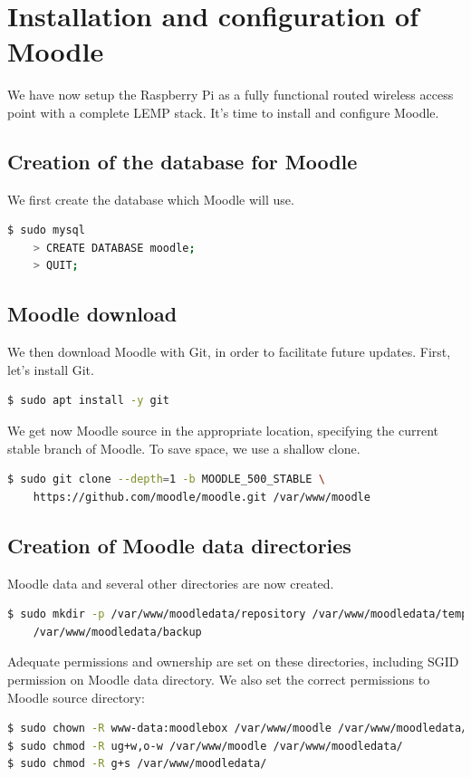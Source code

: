 \documentclass[12pt]{article}
\begin{document}
\section{Installation and configuration of Moodle}

We have now setup the Raspberry Pi as a fully functional routed wireless access point with a complete LEMP stack.
It's time to install and configure Moodle.

\subsection{Creation of the database for Moodle}

We first create the database which Moodle will use.
\begin{lstlisting}[language=bash]
$ sudo mysql
    > CREATE DATABASE moodle;
    > QUIT;
\end{lstlisting}

\subsection{Moodle download}

We then download Moodle with Git, in order to facilitate future updates.
First, let's install Git.
\begin{lstlisting}[language=bash]
$ sudo apt install -y git
\end{lstlisting}

We get now Moodle source in the appropriate location, specifying the current stable branch of Moodle.
To save space, we use a shallow clone.
\begin{lstlisting}[language=bash]
$ sudo git clone --depth=1 -b MOODLE_500_STABLE \
    https://github.com/moodle/moodle.git /var/www/moodle
\end{lstlisting}

\subsection{Creation of Moodle data directories}

Moodle data and several other directories are now created.
\begin{lstlisting}[language=bash]
$ sudo mkdir -p /var/www/moodledata/repository /var/www/moodledata/temp \
    /var/www/moodledata/backup
\end{lstlisting}
Adequate permissions and ownership are set on these directories, including SGID permission on Moodle data directory.
We also set the correct permissions to Moodle source directory:
\begin{lstlisting}[language=bash]
$ sudo chown -R www-data:moodlebox /var/www/moodle /var/www/moodledata/
$ sudo chmod -R ug+w,o-w /var/www/moodle /var/www/moodledata/
$ sudo chmod -R g+s /var/www/moodledata/
\end{lstlisting}
\end{document}
